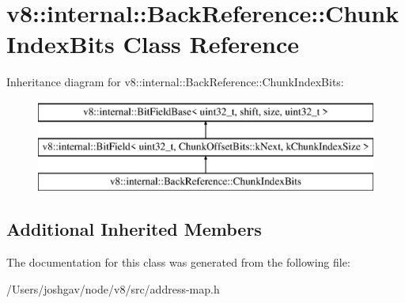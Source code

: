 \hypertarget{classv8_1_1internal_1_1_back_reference_1_1_chunk_index_bits}{}\section{v8\+:\+:internal\+:\+:Back\+Reference\+:\+:Chunk\+Index\+Bits Class Reference}
\label{classv8_1_1internal_1_1_back_reference_1_1_chunk_index_bits}
Inheritance diagram for v8\+:\+:internal\+:\+:Back\+Reference\+:\+:Chunk\+Index\+Bits\+:\begin{figure}[H]
\begin{center}
\leavevmode
\includegraphics[height=3.000000cm]{classv8_1_1internal_1_1_back_reference_1_1_chunk_index_bits}
\end{center}
\end{figure}
\subsection*{Additional Inherited Members}


The documentation for this class was generated from the following file\+:\begin{DoxyCompactItemize}
\item 
/\+Users/joshgav/node/v8/src/address-\/map.\+h\end{DoxyCompactItemize}
